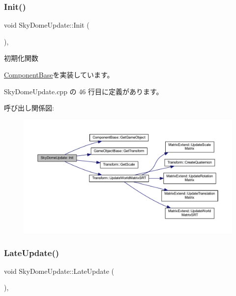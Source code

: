 \subsubsection{\texorpdfstring{Init()}{Init()}}
{\footnotesize\ttfamily void Sky\+Dome\+Update\+::\+Init (\begin{DoxyParamCaption}{ }\end{DoxyParamCaption})\hspace{0.3cm}{\ttfamily [override]}, {\ttfamily [virtual]}}



初期化関数 



\mbox{\hyperlink{class_component_base_a125939d6befe42f28886a6523e86b18b}{Component\+Base}}を実装しています。



 Sky\+Dome\+Update.\+cpp の 46 行目に定義があります。

呼び出し関係図\+:\nopagebreak
\begin{figure}[H]
\begin{center}
\leavevmode
\includegraphics[width=350pt]{class_sky_dome_update_ab4fec6d13590c07e39e6e8b4f7f7613a_cgraph}
\end{center}
\end{figure}
\mbox{\label{class_sky_dome_update_a94347cb50b4dc13528738a7b812da261}} 
\subsubsection{\texorpdfstring{Late\+Update()}{LateUpdate()}}
{\footnotesize\ttfamily void Sky\+Dome\+Update\+::\+Late\+Update (\begin{DoxyParamCaption}{ }\end{DoxyParamCaption})\hspace{0.3cm}{\ttfamily [override]}, {\ttfamily [virtual]}}



